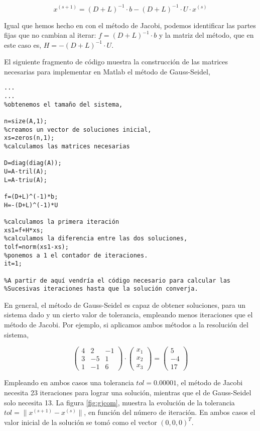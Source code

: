 \begin{equation*}
x^{(s+1)}= (D+L)^{-1}\cdot b-(D+L)^{-1}\cdot U\cdot x^{(s)}
\end{equation*}

Igual que hemos hecho en con el método de Jacobi, podemos identificar las partes fijas que no cambian al iterar: $f=(D+L)^{-1}\cdot b$ y la matriz del método, que en este caso es, $H=-(D+L)^{-1}\cdot U$.

El siguiente fragmento de código muestra la construcción de las matrices necesarias para implementar en Matlab el método de Gauss-Seidel,
\begin{verbatim}
...
...
%obtenemos el tamaño del sistema,

n=size(A,1);
%creamos un vector de soluciones inicial,
xs=zeros(n,1);
%calculamos las matrices necesarias

D=diag(diag(A));
U=A-tril(A);
L=A-triu(A);

f=(D+L)^(-1)*b;
H=-(D+L)^(-1)*U

%calculamos la primera iteración
xs1=f+H*xs;
%calculamos la diferencia entre las dos soluciones,
tolf=norm(xs1-xs);
%ponemos a 1 el contador de iteraciones.
it=1;

%A partir de aquí vendría el código necesario para calcular las 
%Sucesivas iteraciones hasta que la solución converja.
\end{verbatim}

En general, el método de Gauss-Seidel es capaz de obtener soluciones, para un sistema dado y un cierto valor de tolerancia, empleando menos iteraciones que el método de Jacobi. Por ejemplo, si aplicamos ambos métodos a la resolución del sistema,

\begin{equation*}
\begin{pmatrix}
4& 2& -1\\
3& -5& 1\\
1& -1& 6
\end{pmatrix}\cdot \begin{pmatrix}
x_1\\
x_2\\
x_3
\end{pmatrix}=\begin{pmatrix}
5\\
-4\\
17
\end{pmatrix}
\end{equation*}

Empleando en ambos casos una tolerancia $tol=0.0000	1$, el método de Jacobi necesita 23 iteraciones para lograr una solución, mientras que el de Gauss-Seidel solo necesita 13. La figura \ref{fig:gjcom}, muestra la evolución de la tolerancia $tol=\lVert x^{(s+1)}-x^{(s)} \rVert$, en función del número de iteración. En ambos casos el valor inicial de la solución se tomó como el vector $(0,0,0)^T$.


